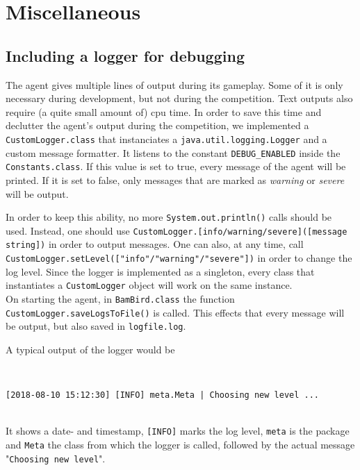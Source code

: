 \section{Miscellaneous}\label{ch:misc}

\subsection{Including a logger for debugging}\label{subsec:logger}
The agent gives multiple lines of output during its gameplay. Some of it is only necessary during development, but not during the competition. Text outputs also require (a quite small amount of) cpu time. In order to save this time and declutter the agent's output during the competition, we implemented a \texttt{CustomLogger.class} that instanciates a \texttt{java.util.logging.Logger} and a custom message formatter. It listens to the constant \texttt{DEBUG\_ENABLED} inside the \texttt{Constants.class}. If this value is set to true, every message of the agent will be printed. If it is set to false, only messages that are marked as \textit{warning} or \textit{severe} will be output.

In order to keep this ability, no more \texttt{System.out.println()} calls should be used. Instead, one should use \texttt{CustomLogger.[info/warning/severe]([message string])} in order to output messages. One can also, at any time, call \texttt{CustomLogger.setLevel(["info"/"warning"/"severe"])} in order to change the log level. Since the logger is implemented as a singleton, every class that instantiates a \texttt{CustomLogger} object will work on the same instance.\\
On starting the agent, in \texttt{BamBird.class} the function \texttt{CustomLogger.saveLogsToFile()} is called. This effects that every message will be output, but also saved in \texttt{logfile.log}. 

A typical output of the logger would be

\ \\
\begin{centering}
\texttt{[2018-08-10 15:12:30] [INFO] meta.Meta | Choosing new level ... } \\
\end{centering}
\ \\
It shows a date- and timestamp, \texttt{[INFO]} marks the log level, \texttt{meta} is the package and \texttt{Meta} the class from which the logger is called, followed by the actual message "\texttt{Choosing new level}".

